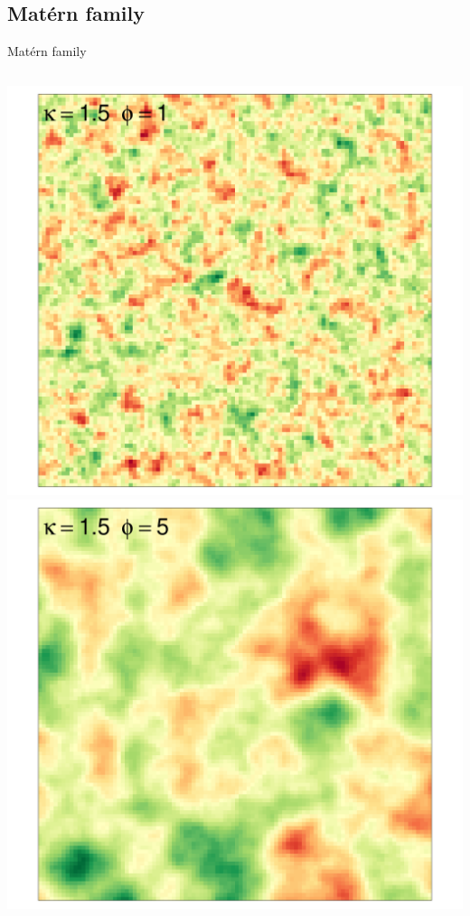 \documentclass[
  ignorenonframetext,
]{beamer}
\begin{document}
\hypertarget{matuxe9rn-family-3}{%
\subsection{Matérn family}\label{matuxe9rn-family-3}}

\begin{frame}{Matérn family}
\small

\begin{columns}[T]
\begin{column}{0.33\textwidth}
\includegraphics{Lecture_1_files/figure-beamer/unnamed-chunk-33-1.pdf}
\includegraphics{Lecture_1_files/figure-beamer/unnamed-chunk-34-1.pdf}
\end{column}


\end{columns}
\end{frame}
\end{document}
